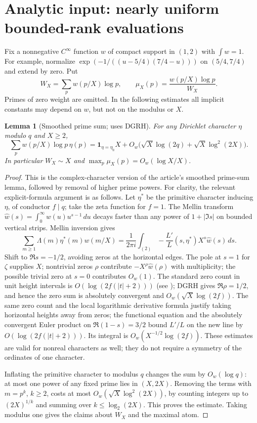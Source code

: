 \documentclass[11pt]{article}
\newtheorem{lemma}[theorem]{Lemma}
\theoremstyle{remark}\newtheorem{remark}[theorem]{Remark}
\begin{document}
\section{Analytic input: nearly uniform bounded-rank evaluations}
Fix a nonnegative $C^\infty$ function $w$ of compact support in $(1,2)$ with $\int w=1$. For example, normalize $\exp(-1/((u-5/4)(7/4-u)))$ on $(5/4,7/4)$ and extend by zero. Put
\[
 W_X=\sum_p w(p/X)\log p,\qquad
 \mu_X(p)=\frac{w(p/X)\log p}{W_X}.
\]
Primes of zero weight are omitted. In the following estimates all implicit constants may depend on $w$, but not on the modulus or $X$.

\begin{lemma}[Smoothed prime sum; uses DGRH]\label{lem:prime}
For any Dirichlet character $\eta$ modulo $q$ and $X\ge2$,
\[
 \sum_p w(p/X)\log p\,\eta(p)
 =\mathbf 1_{\eta=\eta_0}X+O_w\bigl(\sqrt X\log(2q)+\sqrt X\log^2(2X)\bigr).
\]
In particular $W_X\sim X$ and $\max_p\mu_X(p)=O_w(\log X/X)$.
\end{lemma}
\begin{proof}
This is the complex-character version of the article's smoothed prime-sum lemma, followed by removal of higher prime powers. For clarity, the relevant explicit-formula argument is as follows. Let $\eta^*$ be the primitive character inducing $\eta$, of conductor $f\mid q$; take the zeta function for $f=1$. The Mellin transform $\widehat w(s)=\int_0^\infty w(u)u^{s-1}\,du$ decays faster than any power of $1+|\Im s|$ on bounded vertical strips. Mellin inversion gives
\[
 \sum_{m\ge1}\Lambda(m)\eta^*(m)w(m/X)
 =\frac1{2\pi i}\int_{(2)}-\frac{L'}{L}(s,\eta^*)X^s\widehat w(s)\,ds.
\]
Shift to $\Re s=-1/2$, avoiding zeros at the horizontal edges. The pole at $s=1$ for $\zeta$ supplies $X$; nontrivial zeros $\rho$ contribute $-X^\rho\widehat w(\rho)$ with multiplicity; the possible trivial zero at $s=0$ contributes $O_w(1)$. The standard zero count in unit height intervals is $O(\log(2f(|t|+2)))$ (see \cite{MV}); DGRH gives $\Re\rho=1/2$, and hence the zero sum is absolutely convergent and $O_w(\sqrt X\log(2f))$. The same zero count and the local logarithmic derivative formula justify taking horizontal heights away from zeros; the functional equation and the absolutely convergent Euler product on $\Re(1-s)=3/2$ bound $L'/L$ on the new line by $O(\log(2f(|t|+2)))$. Its integral is $O_w(X^{-1/2}\log(2f))$. These estimates are valid for nonreal characters as well; they do not require a symmetry of the ordinates of one character.

Inflating the primitive character to modulus $q$ changes the sum by $O_w(\log q)$: at most one power of any fixed prime lies in $(X,2X)$. Removing the terms with $m=p^k$, $k\ge2$, costs at most $O_w(\sqrt X\log^2(2X))$, by counting integers up to $(2X)^{1/k}$ and summing over $k\le\log_2(2X)$. This proves the estimate. Taking modulus one gives the claims about $W_X$ and the maximal atom.
\end{proof}
\end{document}
